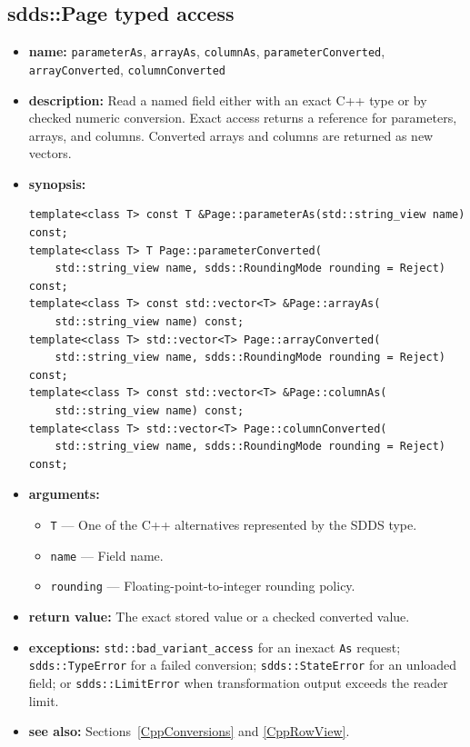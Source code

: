 \documentclass[11pt]{article}
\begin{document}
\subsection{sdds::Page typed access}
\label{CppPageTypedAccess}

\begin{itemize}
\item {\bf name:}\newline
{\tt parameterAs}, {\tt arrayAs}, {\tt columnAs},
{\tt parameterConverted}, {\tt arrayConverted}, {\tt columnConverted}
\item {\bf description:}\newline
Read a named field either with an exact C++ type or by checked numeric
conversion.  Exact access returns a reference for parameters, arrays, and
columns.  Converted arrays and columns are returned as new vectors.
\item {\bf synopsis:}
\begin{verbatim}
template<class T> const T &Page::parameterAs(std::string_view name) const;
template<class T> T Page::parameterConverted(
    std::string_view name, sdds::RoundingMode rounding = Reject) const;
template<class T> const std::vector<T> &Page::arrayAs(
    std::string_view name) const;
template<class T> std::vector<T> Page::arrayConverted(
    std::string_view name, sdds::RoundingMode rounding = Reject) const;
template<class T> const std::vector<T> &Page::columnAs(
    std::string_view name) const;
template<class T> std::vector<T> Page::columnConverted(
    std::string_view name, sdds::RoundingMode rounding = Reject) const;
\end{verbatim}
\item {\bf arguments:}
\begin{itemize}
\item {\tt T} --- One of the C++ alternatives represented by the SDDS type.
\item {\tt name} --- Field name.
\item {\tt rounding} --- Floating-point-to-integer rounding policy.
\end{itemize}
\item {\bf return value:}\newline
The exact stored value or a checked converted value.
\item {\bf exceptions:}\newline
{\tt std::bad\_variant\_access} for an inexact {\tt *As} request;
{\tt sdds::TypeError} for a failed conversion; {\tt sdds::StateError} for an
unloaded field; or {\tt sdds::LimitError} when transformation output exceeds
the reader limit.
\item {\bf see also:}\newline
Sections~\ref{CppConversions} and \ref{CppRowView}.
\end{itemize}
\end{document}
